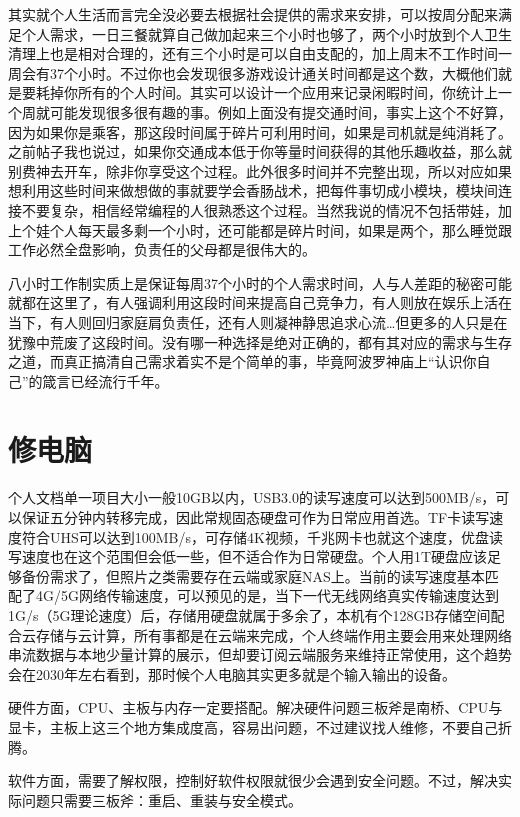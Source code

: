 \documentclass[
  letterpaper,
  DIV=11,
  numbers=noendperiod]{scrreprt}
\begin{document}
其实就个人生活而言完全没必要去根据社会提供的需求来安排，可以按周分配来满足个人需求，一日三餐就算自己做加起来三个小时也够了，两个小时放到个人卫生清理上也是相对合理的，还有三个小时是可以自由支配的，加上周末不工作时间一周会有37个小时。不过你也会发现很多游戏设计通关时间都是这个数，大概他们就是要耗掉你所有的个人时间。其实可以设计一个应用来记录闲暇时间，你统计上一个周就可能发现很多很有趣的事。例如上面没有提交通时间，事实上这个不好算，因为如果你是乘客，那这段时间属于碎片可利用时间，如果是司机就是纯消耗了。之前帖子我也说过，如果你交通成本低于你等量时间获得的其他乐趣收益，那么就别费神去开车，除非你享受这个过程。此外很多时间并不完整出现，所以对应如果想利用这些时间来做想做的事就要学会香肠战术，把每件事切成小模块，模块间连接不要复杂，相信经常编程的人很熟悉这个过程。当然我说的情况不包括带娃，加上个娃个人每天最多剩一个小时，还可能都是碎片时间，如果是两个，那么睡觉跟工作必然全盘影响，负责任的父母都是很伟大的。

八小时工作制实质上是保证每周37个小时的个人需求时间，人与人差距的秘密可能就都在这里了，有人强调利用这段时间来提高自己竞争力，有人则放在娱乐上活在当下，有人则回归家庭肩负责任，还有人则凝神静思追求心流\ldots 但更多的人只是在犹豫中荒废了这段时间。没有哪一种选择是绝对正确的，都有其对应的需求与生存之道，而真正搞清自己需求着实不是个简单的事，毕竟阿波罗神庙上``认识你自己''的箴言已经流行千年。

\section{修电脑}\label{ux4feeux7535ux8111}

个人文档单一项目大小一般10GB以内，USB3.0的读写速度可以达到500MB/s，可以保证五分钟内转移完成，因此常规固态硬盘可作为日常应用首选。TF卡读写速度符合UHS可以达到100MB/s，可存储4K视频，千兆网卡也就这个速度，优盘读写速度也在这个范围但会低一些，但不适合作为日常硬盘。个人用1T硬盘应该足够备份需求了，但照片之类需要存在云端或家庭NAS上。当前的读写速度基本匹配了4G/5G网络传输速度，可以预见的是，当下一代无线网络真实传输速度达到1G/s（5G理论速度）后，存储用硬盘就属于多余了，本机有个128GB存储空间配合云存储与云计算，所有事都是在云端来完成，个人终端作用主要会用来处理网络串流数据与本地少量计算的展示，但却要订阅云端服务来维持正常使用，这个趋势会在2030年左右看到，那时候个人电脑其实更多就是个输入输出的设备。

硬件方面，CPU、主板与内存一定要搭配。解决硬件问题三板斧是南桥、CPU与显卡，主板上这三个地方集成度高，容易出问题，不过建议找人维修，不要自己折腾。

软件方面，需要了解权限，控制好软件权限就很少会遇到安全问题。不过，解决实际问题只需要三板斧：重启、重装与安全模式。
\end{document}
